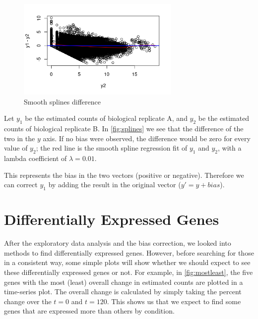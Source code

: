 \documentclass[11pt,twoside]{article}
\numberwithin{Theorem}{section}
\numberwithin{Definition}{section}
\numberwithin{Lemma}{section}
\numberwithin{Algorithm}{section}
\numberwithin{equation}{section}
\begin{document}
\vspace*{1em}
\begin{figure}[]
\centering
\includegraphics[width=0.7\textwidth]{./output/bias-correction.pdf}
\caption{Smooth splines difference}
\label{fig:splines}
\end{figure}
\vspace{2em}

Let $y_1$ be the estimated counts of biological replicate A, and $y_2$ be the estimated counts of biological replicate B. In \autoref{fig:splines} we see that the difference of the two in the $y$ axis. If no bias were observed, the difference would be zero for every value of $y_2$; the red line is the smooth spline regression fit of $y_1$ and $y_2$, with a lambda coefficient of $\lambda = 0.01$. 

This represents the bias in the two vectors (positive or negative). Therefore we can correct $y_1$ by adding the result in the original vector ($y' = y + bias$). 

\clearpage
\section{Differentially Expressed Genes}
\label{sec:diff}

After the exploratory data analysis and the bias correction, we looked into methods to find differentially expressed genes. However, before searching for those in a consistent way, some simple plots will show whether we should expect to see these differentially expressed genes or not. For example, in \autoref{fig:mostleast}, the five genes with the most (least) overall change in estimated counts are plotted in a time-series plot. The overall change is calculated by simply taking the percent change over the $t=0$ and $t=120$. This shows us that we expect to find some genes that are expressed more than others by condition. 
\end{document}
